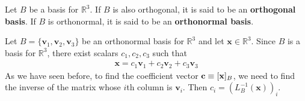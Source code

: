 \documentclass[12pt,letterpaper,reqno]{article}
\numberwithin{equation}{section}
\newcommand{\bv}{\mathbf{v}}
\newcommand{\bx}{\mathbf{x}}
\begin{document}
\begin{defn}
	Let $B$ be a basis for $\mathbb{R}^3$. If $B$ is also orthogonal, it is said to be an {\bf orthogonal basis}. If $B$ is orthonormal, it is said to be an {\bf orthonormal basis}.
\end{defn}

Let $B=\{\bv_1,\bv_2,\bv_3\}$ be an orthonormal basis for $\mathbb{R}^3$ and let $\bx \in \mathbb{R}^3$. Since $B$ is a basis for $\mathbb{R}^3$, there exist scalars $c_1,c_2,c_3$ such that 
\begin{align*}
	\bx=c_1\bv_1+c_2\bv_2+c_3\bv_3
\end{align*} 
As we have seen before, to find the coefficient vector ${\bf c}\equiv [\bx]_B$, we need to find the inverse of the matrix whose $i$th column is $\bv_i$. Then $c_i=(L_B^{-1}(\bx))_i$.
\end{document}
